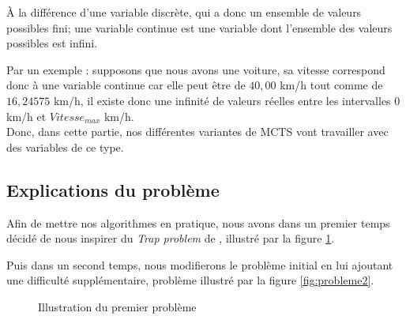 \documentclass[pdftex,french, english]{article}	%
\begin{document}
	À la différence d'une variable discrète, qui a donc un ensemble de valeurs possibles fini; une variable continue est une variable dont l'ensemble des valeurs possibles est infini.

	Par un exemple : supposons que nous avons une voiture, sa vitesse correspond donc à une variable continue car elle peut être de $40,00$ km/h tout comme de $16,24575$ km/h, il existe donc une infinité de valeurs réelles entre les intervalles $0$ km/h et $Vitesse_{max}$ km/h. \\

	Donc, dans cette partie, nos différentes variantes de MCTS vont travailler avec des variables de ce type.

	\subsection{Explications du problème} \label{probleme}

	Afin de mettre nos algorithmes en pratique, nous avons dans un premier temps décidé de nous inspirer du \textit{Trap problem} de \cite{couetoux01}, illustré par la figure \ref{fig:probleme1}.
    
    Puis dans un second temps, nous modifierons le problème initial en lui ajoutant une difficulté supplémentaire, problème illustré par la figure \ref{fig:probleme2}.
	\\
	\begin{figure}[H]
	\centering
		\caption{Illustration du premier problème} \label{fig:probleme1}
	\end{figure}
    
\end{document}
